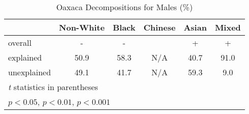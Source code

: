 \begin{table}[htbp]\centering
\caption{Oaxaca Decompositions for Males (\%)}
\begin{tabular}{l*{5}{c}}
\hline\hline
          &Non-White&    Black&  Chinese&    Asian&    Mixed\\
\hline
overall   &     -    &     -    &         &    +     &      +   \\
explained &     50.9\sym{***}&     58.3\sym{***}&    N/A&     40.7\sym{***}&     91.0\sym{*}\\
unexplained&     49.1\sym{***}&     41.7\sym{***}&    N/A&     59.3\sym{***}&      9.0\\
\hline\hline
\multicolumn{6}{l}{\footnotesize \textit{t} statistics in parentheses}\\
\multicolumn{6}{l}{\footnotesize \sym{*} \(p<0.05\), \sym{**} \(p<0.01\), \sym{***} \(p<0.001\)}\\
\end{tabular}
\label{tab:oaxaca_pct_male}
\end{table}
